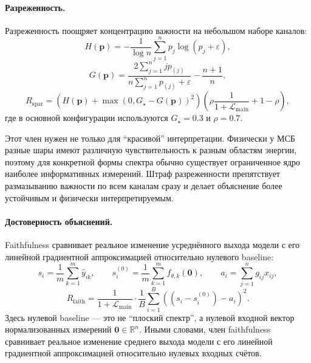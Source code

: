 \paragraph{Разреженность.}
Разреженность поощряет концентрацию важности на небольшом наборе каналов:
\begin{equation}
H(\mathbf{p}) = -\frac{1}{\log n}\sum_{j=1}^{n} p_j \log(p_j + \varepsilon),
\end{equation}
\begin{equation}
G(\mathbf{p}) = \frac{2\sum_{j=1}^{n} j p_{(j)}}{n\sum_{j=1}^{n} p_{(j)} + \varepsilon} - \frac{n+1}{n},
\end{equation}
\begin{equation}
R_{\mathrm{spar}} = \left(H(\mathbf{p}) + \max(0, G_{\star} - G(\mathbf{p}))^2\right)
\left(\rho\frac{1}{1 + \mathcal{L}_{\mathrm{main}}} + 1 - \rho\right),
\end{equation}
где в основной конфигурации используются $G_{\star}=0.3$ и $\rho=0.7$.

Этот член нужен не только для ``красивой'' интерпретации. Физически у МСБ разные шары имеют различную чувствительность к разным областям энергии, поэтому для конкретной формы спектра обычно существует ограниченное ядро наиболее информативных измерений. Штраф разреженности препятствует размазыванию важности по всем каналам сразу и делает объяснение более устойчивым и физически интерпретируемым.

\paragraph{Достоверность объяснений.}
Faithfulness сравнивает реальное изменение усреднённого выхода модели с его линейной градиентной аппроксимацией относительно нулевого baseline:
\begin{equation}
s_i = \frac{1}{m}\sum_{k=1}^{m}\hat{y}_{ik},
\qquad
s_i^{(0)} = \frac{1}{m}\sum_{k=1}^{m} f_{\theta,k}(\mathbf{0}),
\qquad
a_i = \sum_{j=1}^{n} g_{ij} x_{ij},
\end{equation}
\begin{equation}
R_{\mathrm{faith}} = \frac{1}{1 + \mathcal{L}_{\mathrm{main}}}
\cdot
\frac{1}{B}\sum_{i=1}^{B} \left((s_i - s_i^{(0)}) - a_i\right)^2.
\end{equation}
Здесь нулевой baseline --- это не ``плоский спектр'', а нулевой входной вектор нормализованных измерений $\mathbf{0}\in\mathbb{R}^n$. Иными словами, член faithfulness сравнивает реальное изменение среднего выхода модели с его линейной градиентной аппроксимацией относительно нулевых входных счётов.

